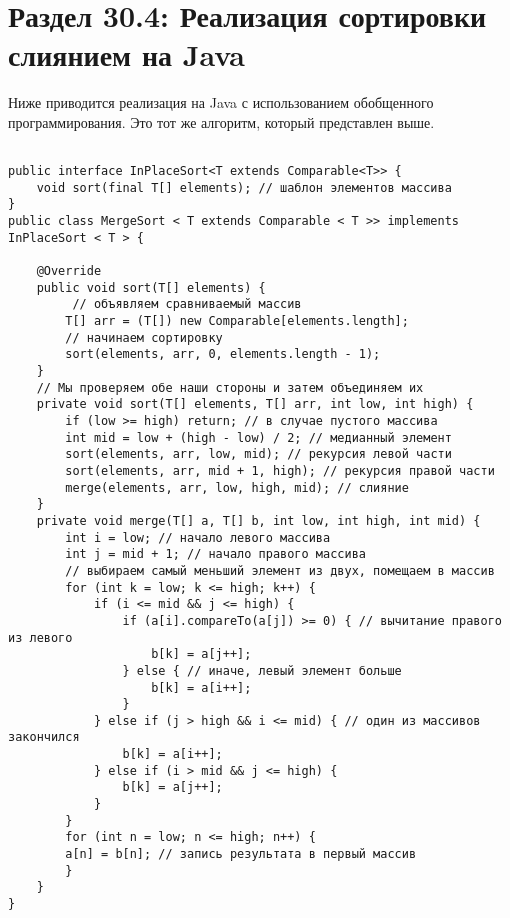 \section*{Раздел 30.4: Реализация сортировки слиянием на Java}
Ниже приводится реализация на Java с использованием обобщенного программирования. Это тот же алгоритм, который представлен выше.\\
\begin{tcolorbox}
\begin{verbatim}

public interface InPlaceSort<T extends Comparable<T>> {
	void sort(final T[] elements); // шаблон элементов массива
}
public class MergeSort < T extends Comparable < T >> implements InPlaceSort < T > {

	@Override
	public void sort(T[] elements) {
		 // объявляем сравниваемый массив
		T[] arr = (T[]) new Comparable[elements.length];
		// начинаем сортировку
		sort(elements, arr, 0, elements.length - 1);
	}
	// Мы проверяем обе наши стороны и затем объединяем их
	private void sort(T[] elements, T[] arr, int low, int high) {
		if (low >= high) return; // в случае пустого массива
		int mid = low + (high - low) / 2; // медианный элемент
		sort(elements, arr, low, mid); // рекурсия левой части
		sort(elements, arr, mid + 1, high); // рекурсия правой части
		merge(elements, arr, low, high, mid); // слияние
	}
	private void merge(T[] a, T[] b, int low, int high, int mid) {
		int i = low; // начало левого массива
		int j = mid + 1; // начало правого массива
		// выбираем самый меньший элемент из двух, помещаем в массив
		for (int k = low; k <= high; k++) {
			if (i <= mid && j <= high) {
				if (a[i].compareTo(a[j]) >= 0) { // вычитание правого из левого
					b[k] = a[j++];
				} else { // иначе, левый элемент больше
					b[k] = a[i++];
				}
			} else if (j > high && i <= mid) { // один из массивов закончился 
				b[k] = a[i++];
			} else if (i > mid && j <= high) {
				b[k] = a[j++];
			}
		}
		for (int n = low; n <= high; n++) {
		a[n] = b[n]; // запись результата в первый массив 
		}
	}
}
\end{verbatim}
\end{tcolorbox}
